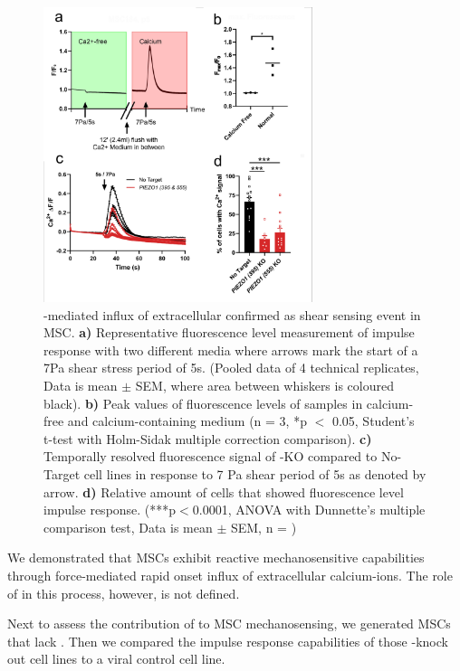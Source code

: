 \begin{figure}
\centering
\includegraphics[width = 0.7\textwidth]{Combined_CalciumFree_KnockOut.png}
\caption{\Piezo{}-mediated influx of extracellular \calciumS confirmed as shear sensing event in MSC. \hfill \newline 
\textbf{a)} Representative fluorescence level measurement of impulse response with two different media where arrows mark the start of a 7Pa shear stress period of 5s. (Pooled data of 4 technical replicates, Data is mean $\pm$ SEM, where area between whiskers is coloured black).	
\textbf{b)} Peak values of fluorescence levels of samples in calcium-free and calcium-containing medium (n = 3, *p $<$ 0.05, Student's t-test with Holm-Sidak multiple correction comparison). 
\textbf{c)} Temporally resolved fluorescence signal of \Piezo{}-KO compared to No-Target cell lines in response to 7 Pa shear period of 5s as denoted by arrow. 
\textbf{d)} Relative amount of cells that showed fluorescence level impulse response. (***p$<$0.0001, ANOVA with Dunnette's multiple comparison test, Data is mean $\pm$ SEM, n = )}
\label{fig:CalcImaging_Cells}
\end{figure}

We demonstrated that MSCs exhibit reactive mechanosensitive capabilities through force-mediated rapid onset influx of extracellular calcium-ions. The role of \Piezo{} in this process, however, is not defined. 

Next to assess the contribution of \Piezo{} to MSC mechanosensing, we generated MSCs that lack \Piezo{}. Then we compared the impulse response capabilities of those \Piezo{}-knock out cell lines to a viral control cell line.\\

